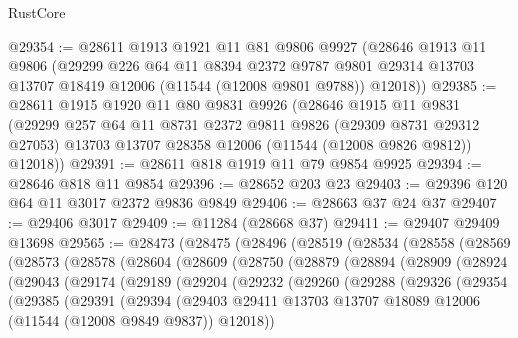 \begin{lexlean}{RustCore}
\begin{coremodule}
@29354 := @28611
    @1913
    @1921
    @11
    @81
    @9806
    @9927
    (@28646
      @1913
      @11
      @9806
      (@29299
        @226
        @64
        @11
        @8394
        @2372
        @9787
        @9801
        @29314
        @13703
        @13707
        @18419
        @12006
        (@11544 (@12008 @9801 @9788))
        @12018))
@29385 := @28611
    @1915
    @1920
    @11
    @80
    @9831
    @9926
    (@28646
      @1915
      @11
      @9831
      (@29299
        @257
        @64
        @11
        @8731
        @2372
        @9811
        @9826
        (@29309 @8731 @29312 @27053)
        @13703
        @13707
        @28358
        @12006
        (@11544 (@12008 @9826 @9812))
        @12018))
@29391 := @28611 @818 @1919 @11 @79 @9854 @9925
@29394 := @28646 @818 @11 @9854
@29396 := @28652 @203 @23
@29403 := @29396 @120 @64 @11 @3017 @2372 @9836 @9849
@29406 := @28663 @37 @24 @37
@29407 := @29406 @3017
@29409 := @11284 (@28668 @37)
@29411 := @29407 @29409 @13698
@29565 := @28473
    (@28475
      (@28496
        (@28519
          (@28534
            (@28558
              (@28569
                (@28573
                  (@28578
                    (@28604
                      (@28609
                        (@28750
                          (@28879
                            (@28894
                              (@28909
                                (@28924
                                  (@29043
                                    (@29174
                                      (@29189
                                        (@29204
                                          (@29232
                                            (@29260
                                              (@29288
                                                (@29326
                                                  (@29354
                                                    (@29385
                                                      (@29391
                                                        (@29394
                                                          (@29403
                                                            @29411
                                                            @13703
                                                            @13707
                                                            @18089
                                                            @12006
                                                            (@11544 (@12008 @9849 @9837))
                                                            @12018))

\end{coremodule}
\end{lexlean}
